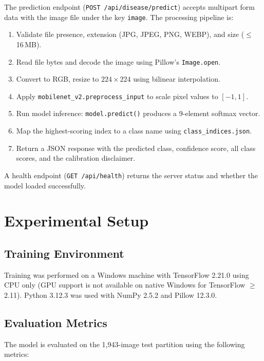\documentclass[conference]{IEEEtran}
\begin{document}
The prediction endpoint (\texttt{POST /api/disease/predict}) accepts multipart form data with the image file under the key \texttt{image}. The processing pipeline is:
\begin{enumerate}
    \item Validate file presence, extension (JPG, JPEG, PNG, WEBP), and size ($\leq$ 16\,MB).
    \item Read file bytes and decode the image using Pillow's \texttt{Image.open}.
    \item Convert to RGB, resize to $224 \times 224$ using bilinear interpolation.
    \item Apply \texttt{mobilenet\_v2.preprocess\_input} to scale pixel values to $[-1, 1]$.
    \item Run model inference: \texttt{model.predict()} produces a 9-element softmax vector.
    \item Map the highest-scoring index to a class name using \texttt{class\_indices.json}.
    \item Return a JSON response with the predicted class, confidence score, all class scores, and the calibration disclaimer.
\end{enumerate}

A health endpoint (\texttt{GET /api/health}) returns the server status and whether the model loaded successfully.

\section{Experimental Setup}
\label{sec:setup}

\subsection{Training Environment}

Training was performed on a Windows machine with TensorFlow 2.21.0 using CPU only (GPU support is not available on native Windows for TensorFlow $\geq$ 2.11). Python 3.12.3 was used with NumPy 2.5.2 and Pillow 12.3.0.

\subsection{Evaluation Metrics}

The model is evaluated on the 1{,}943-image test partition using the following metrics:
\end{document}
